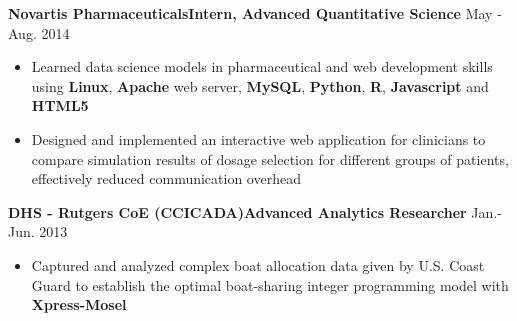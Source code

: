 \documentclass[10.5pt]{res} %
\begin{document}
\begin{resume}
\begin{itemize}
		\end{itemize}\vspace{-\topsep}
	\textbf{Novartis Pharmaceuticals}\quad\quad\quad \textbf{Intern, Advanced Quantitative Science}    \hfill May - Aug. 2014
		\begin{itemize} pt
			\item Learned data science models in pharmaceutical and web development skills using \textbf{Linux}, \textbf{Apache} web server, \textbf{MySQL}, \textbf{Python}, \textbf{R}, \textbf{Javascript} and \textbf{HTML5} %
			\item %
			Designed and implemented an interactive web application for clinicians to compare simulation results of dosage selection for different groups of patients, effectively reduced communication overhead  
		\end{itemize}\vspace{-\topsep}
    \textbf{%
    DHS - Rutgers CoE (CCICADA)}\quad\quad\textbf{Advanced Analytics Researcher}  \hfill Jan.-Jun. 2013
        \begin{itemize} pt
            \item Captured and analyzed complex boat allocation data given by U.S. Coast Guard to establish the optimal boat-sharing integer programming model with \textbf{Xpress-Mosel}%

\end{itemize}
\end{resume}
\end{document}
